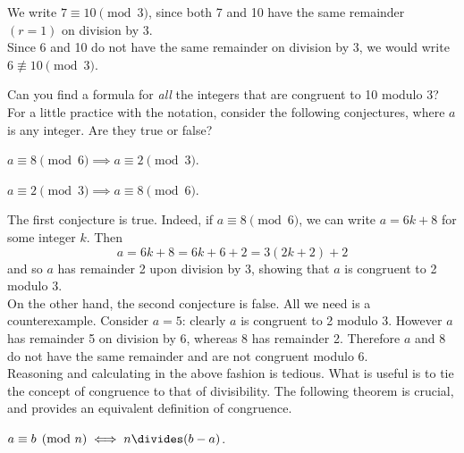 \begin{exs}
We write $7\equiv 10\pmod 3$, since both 7 and 10 have the same remainder $(r=1)$ on division by $3$.\\
Since 6 and 10 do not have the same remainder on division by 3, we would write $6\not\equiv 10\pmod 3$.
\end{exs}

\noindent Can you find a formula for \emph{all} the integers that are congruent to 10 modulo 3?\\

\noindent For a little practice with the notation, consider the following conjectures, where $a$ is any integer. Are they true or false? 

\begin{conj}
$a\equiv 8\pmod 6\implies a\equiv 2\pmod 3$.
\end{conj}

\begin{conj}
$a\equiv 2\pmod 3\implies a\equiv 8\pmod 6$.
\end{conj}

\noindent The first conjecture is true. Indeed, if $a\equiv 8\pmod 6$, we can write $a=6k+8$ for some integer $k$. Then
\[a=6k+8=6k+6+2=3(2k+2)+2\]
and so $a$ has remainder 2 upon division by 3, showing that $a$ is congruent to 2 modulo 3.\\
On the other hand, the second conjecture is false. All we need is a counterexample. Consider $a=5$: clearly $a$ is congruent to 2 modulo 3. However $a$ has remainder 5 on division by 6, whereas 8 has remainder 2. Therefore $a$ and 8 do not have the same remainder and are not congruent modulo 6.\\

\noindent Reasoning and calculating in the above fashion is tedious. What is useful is to tie the concept of congruence to that of divisibility. The following theorem is crucial, and provides an equivalent definition of congruence. 

\begin{thm}\label{thm:congdiv}
$a\equiv b\pmod n\iff n\divides (b-a)$.
\end{thm}

